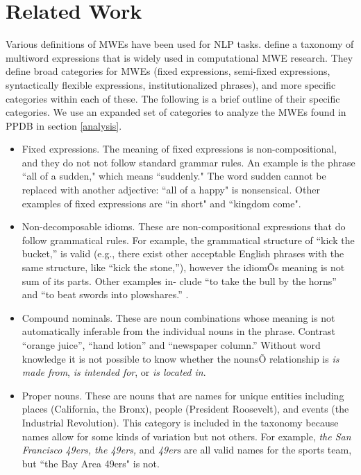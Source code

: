 \documentclass[11pt]{article}
\begin{document}
\section{Related Work}

Various definitions of MWEs have been used for NLP tasks.  define a taxonomy of multiword expressions that is widely used in computational MWE research. They define broad categories for MWEs (fixed expressions, semi-fixed expressions, syntactically flexible expressions, institutionalized phrases), and more specific categories within each of these. The following is a brief outline of their specific categories.   We use an expanded set of categories to analyze the MWEs found in PPDB in section \ref{analysis}.

\begin{itemize}
\item Fixed expressions.  The meaning of fixed expressions is non-compositional, and they do not not follow standard grammar rules.  An example is the phrase ``all of a sudden," which means ``suddenly." The word sudden cannot be replaced with another adjective: ``all of a happy" is nonsensical. Other examples of fixed expressions are ``in short" and ``kingdom come".

\item Non-decomposable idioms. These are non-compositional expressions that do follow grammatical rules. For example, the grammatical structure of ``kick the bucket,'' is valid (e.g., there exist other acceptable English phrases with the same structure, like ``kick the stone,''), however the idiomÕs meaning is not sum of its parts. Other examples in- clude ``to take the bull by the horns'' and ``to beat swords into plowshares.'' \cite{nunberg1994idioms}. 

\item Compound nominals. These are noun combinations whose meaning is not automatically inferable from the individual nouns in the phrase. Contrast ``orange juice'', ``hand lotion'' and ``newspaper column.'' Without word knowledge it is not possible to know whether the nounsÕ relationship is {\it is made from}, {\it is intended for}, or {\it is located in}.  

\item Proper nouns. These are nouns that are names for unique entities including places (California, the Bronx), people (President Roosevelt), and events (the Industrial Revolution). This category is included in the taxonomy because names allow for some kinds of variation but not others. For example, {\it the San Francisco 49ers, the 49ers,} and {\it 49ers} are all valid names for the sports team, but ``the Bay Area 49ers" is not.


\end{itemize}
\end{document}
